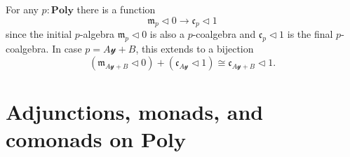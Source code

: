 \documentclass[11pt, one side, article]{memoir}
\theoremstyle{definition}
\theoremstyle{plain}
\newcommand{\Cat}[1]{\mathbf{#1}}%
\newcommand{\yon}{{\mathcal{y}}}
\newcommand{\poly}{\Cat{Poly}}
\newcommand{\0}{\textsf{0}}
\newcommand{\1}{\tn{\textsf{1}}}
\newcommand{\tri}{\mathbin{\triangleleft}}
\newcommand{\cofree}{\mathfrak{c}}
\newcommand{\free}{\mathfrak{m}}
\begin{document}

For any $p:\poly$ there is a function
\begin{equation}
	\free_p\tri 0\to\cofree_p\tri 1
\end{equation}
since the initial $p$-algebra $\free_p\tri 0$ is also a $p$-coalgebra and $\cofree_p\tri 1$ is the final $p$-coalgebra. In case $p=A\yon+B$, this extends to a bijection 
\begin{equation}
	\left(\free_{A\yon+B}\tri 0\right) +\left(\cofree_{A\yon}\tri 1\right) \cong\cofree_{A\yon+B}\tri 1.
\end{equation}

\chapter{Adjunctions, monads, and comonads on $\poly$}\label{chap.adj_mon_com}
\end{document}
